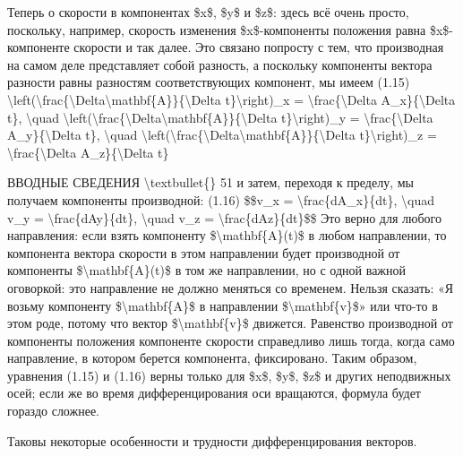 \documentclass[10pt,oneside]{article}
\begin{document}
Теперь о скорости в компонентах \$x\$, \$y\$ и \$z\$: здесь всё очень просто, поскольку, например, скорость изменения \$x\$-компоненты положения равна \$x\$-компоненте скорости и так далее. Это связано попросту с тем, что производная на самом деле представляет собой разность, а поскольку компоненты вектора разности равны разностям соответствующих компонент, мы имеем (1.15) \textbackslash{}left(\textbackslash{}frac\{\textbackslash{}Delta\textbackslash{}mathbf\{A\}\}\{\textbackslash{}Delta t\}\textbackslash{}right)\_x = \textbackslash{}frac\{\textbackslash{}Delta A\_x\}\{\textbackslash{}Delta t\}, \textbackslash{}quad \textbackslash{}left(\textbackslash{}frac\{\textbackslash{}Delta\textbackslash{}mathbf\{A\}\}\{\textbackslash{}Delta t\}\textbackslash{}right)\_y = \textbackslash{}frac\{\textbackslash{}Delta A\_y\}\{\textbackslash{}Delta t\}, \textbackslash{}quad \textbackslash{}left(\textbackslash{}frac\{\textbackslash{}Delta\textbackslash{}mathbf\{A\}\}\{\textbackslash{}Delta t\}\textbackslash{}right)\_z = \textbackslash{}frac\{\textbackslash{}Delta A\_z\}\{\textbackslash{}Delta t\}\par

ВВОДНЫЕ СВЕДЕНИЯ \textbackslash{}textbullet\{\} 51 и затем, переходя к пределу, мы получаем компоненты производной: (1.16) \$\$v\_x = \textbackslash{}frac\{dA\_x\}\{dt\}, \textbackslash{}quad v\_y = \textbackslash{}frac\{dAy\}\{dt\}, \textbackslash{}quad v\_z = \textbackslash{}frac\{dAz\}\{dt\}\$\$ Это верно для любого направления: если взять компоненту \$\textbackslash{}mathbf\{A\}(t)\$ в любом направлении, то компонента вектора скорости в этом направлении будет производной от компоненты \$\textbackslash{}mathbf\{A\}(t)\$ в том же направлении, но с одной важной оговоркой: это направление не должно меняться со временем. Нельзя сказать: «Я возьму компоненту \$\textbackslash{}mathbf\{A\}\$ в направлении \$\textbackslash{}mathbf\{v\}\$» или что-то в этом роде, потому что вектор \$\textbackslash{}mathbf\{v\}\$ движется. Равенство производной от компоненты положения компоненте скорости справедливо лишь тогда, когда само направление, в котором берется компонента, фиксировано. Таким образом, уравнения (1.15) и (1.16) верны только для \$x\$, \$y\$, \$z\$ и других неподвижных осей; если же во время дифференцирования оси вращаются, формула будет гораздо сложнее.\par

Таковы некоторые особенности и трудности дифференцирования векторов.\par
\end{document}
